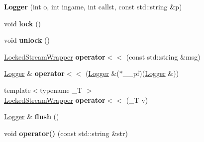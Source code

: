 \begin{DoxyCompactItemize}
\item 
\hypertarget{struct_logger_a4d8a70b4d0b32ec23a38ad0d24363f5c}{
{\bfseries Logger} (int o, int ingame, int callst, const std::string \&p)}
\label{struct_logger_a4d8a70b4d0b32ec23a38ad0d24363f5c}

\item 
\hypertarget{struct_logger_ad9ba90f0c8ee8e73ff2f6d7217cc08d2}{
void {\bfseries lock} ()}
\label{struct_logger_ad9ba90f0c8ee8e73ff2f6d7217cc08d2}

\item 
\hypertarget{struct_logger_a28f2a5b3ccfaa9b233675bec5d7cd61d}{
void {\bfseries unlock} ()}
\label{struct_logger_a28f2a5b3ccfaa9b233675bec5d7cd61d}

\item 
\hypertarget{struct_logger_ab652d4155e7043ba0bcc73b5ea3fbef1}{
\hyperlink{struct_logger_1_1_locked_stream_wrapper}{LockedStreamWrapper} {\bfseries operator$<$$<$} (const std::string \&msg)}
\label{struct_logger_ab652d4155e7043ba0bcc73b5ea3fbef1}

\item 
\hypertarget{struct_logger_a7bf3d7f0eb8a85d4e30ff3607b221d61}{
\hyperlink{struct_logger}{Logger} \& {\bfseries operator$<$$<$} (\hyperlink{struct_logger}{Logger} \&($\ast$\_\-\_\-pf)(\hyperlink{struct_logger}{Logger} \&))}
\label{struct_logger_a7bf3d7f0eb8a85d4e30ff3607b221d61}

\item 
\hypertarget{struct_logger_a0508b32c716f42bde09294a1625f2a8d}{
{\footnotesize template$<$typename \_\-T $>$ }\\\hyperlink{struct_logger_1_1_locked_stream_wrapper}{LockedStreamWrapper} {\bfseries operator$<$$<$} (\_\-T v)}
\label{struct_logger_a0508b32c716f42bde09294a1625f2a8d}

\item 
\hypertarget{struct_logger_ab612d80bcb6c7455412c090514fae5f4}{
\hyperlink{struct_logger}{Logger} \& {\bfseries flush} ()}
\label{struct_logger_ab612d80bcb6c7455412c090514fae5f4}

\item 
\hypertarget{struct_logger_ac1babc0918db32b5f899ee5a00490321}{
void {\bfseries operator()} (const std::string \&str)}
\label{struct_logger_ac1babc0918db32b5f899ee5a00490321}

\end{DoxyCompactItemize}

